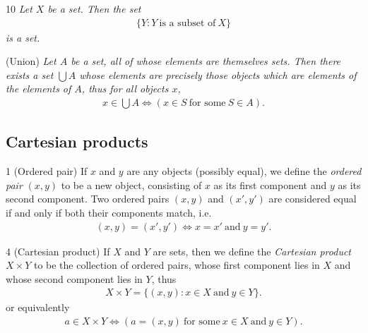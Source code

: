 \begin{lemma}{10}
    \label{power-set-exists}
    \emph{Let $X$ be a set. Then the set
    \begin{align*}
        \{Y:Y~\text{is a subset of}~X\}
    \end{align*}
    is a set.}
\end{lemma}

\begin{axiom}
    \label{ax-union}
    (Union) \emph{Let $A$ be a set, all of whose elements are themselves sets. Then there exists a set $\bigcup A$ whose
    elements are precisely those objects which are elements of the elements of $A$, thus for all objects $x$,
    \begin{align*}
        x\in \bigcup A \iff (x\in S~\text{for some}~S\in A).
    \end{align*}}
\end{axiom}

\subsection{Cartesian products}
\begin{definition}{1}
    \label{ordered-pair}
    (Ordered pair) If $x$ and $y$ are any objects (possibly equal), we define the \emph{ordered pair} $(x, y)$ to be a
    new object, consisting of $x$ as its first component and $y$ as its second component. Two ordered pairs $(x, y)$ and
    $(x', y')$ are considered equal if and only if both their components match, i.e.
    \begin{align*}
        (x, y) = (x', y') \iff x=x'~\text{and}~y=y'.
    \end{align*}
\end{definition}

\begin{definition}{4}
    \label{cartesian-product}
    (Cartesian product) If $X$ and $Y$ are sets, then we define the \emph{Cartesian product} $X\times Y$ to be the collection
    of ordered pairs, whose first component lies in $X$ and whose second component lies in $Y$, thus
    \begin{align*}
        X\times Y = \{(x, y):x\in X~\text{and}~y\in Y\}.
    \end{align*}
    or equivalently
    \begin{align*}
        a\in X\times Y \iff (a=(x, y)~\text{for some}~x\in X~\text{and}~y\in Y).
    \end{align*}
\end{definition}

